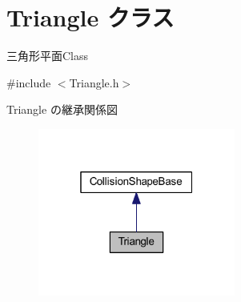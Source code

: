 \hypertarget{class_triangle}{}\section{Triangle クラス}
\label{class_triangle}


三角形平面\+Class  




{\ttfamily \#include $<$Triangle.\+h$>$}



Triangle の継承関係図\nopagebreak
\begin{figure}[H]
\begin{center}
\leavevmode
\includegraphics[width=184pt]{class_triangle__inherit__graph}
\end{center}
\end{figure}

